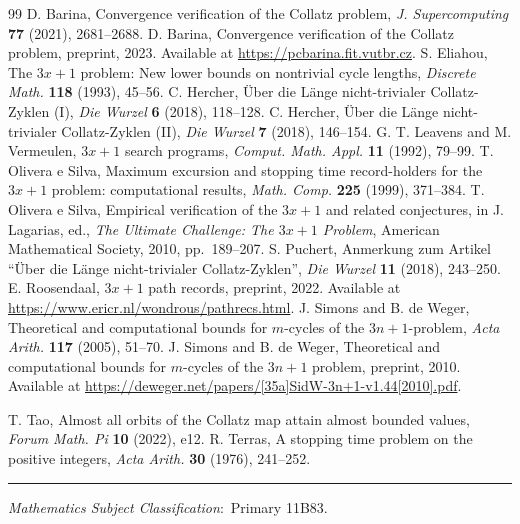 \documentclass[12pt,reqno]{article}
\begin{document}
\begin{thebibliography}{99}
 D. Barina, Convergence verification of the Collatz problem, \textit{J. Supercomputing} \textbf{77} (2021), 2681--2688.
 D. Barina, Convergence verification of the Collatz problem,
preprint, 2023.   Available at \url{https://pcbarina.fit.vutbr.cz}.
  S. Eliahou,  The $3x + 1$ problem:  New lower bounds on nontrivial cycle lengths, \textit{Discrete Math.} \textbf{118} (1993), 45--56.
 C. Hercher, \"{U}ber die L\"{a}nge nicht-trivialer Collatz-Zyklen (I), \textit{Die Wurzel} \textbf{6} (2018), 118--128.
 C. Hercher, \"{U}ber die L\"{a}nge nicht-trivialer Collatz-Zyklen (II), \textit{Die Wurzel} \textbf{7} (2018), 146--154.
 G. T. Leavens and M. Vermeulen,  $3x+1$ search programs, \textit{Comput. Math. Appl.} \textbf{11} (1992), 79--99.
 T. Olivera e Silva, Maximum excursion and stopping time record-holders for the $3x+1$ problem: computational results, \textit{Math. Comp.} \textbf{225} (1999), 371--384.
 T. Olivera e Silva, Empirical verification of the $3x+1$ and related conjectures, in J. Lagarias, ed., \textit{The Ultimate Challenge: The $3x+1$ Problem}, American Mathematical Society, 2010, pp.\ 189--207.
 S. Puchert, Anmerkung zum Artikel ``\"{U}ber die L\"{a}nge nicht-trivialer Collatz-Zyklen'', \textit{Die Wurzel} \textbf{11} (2018), 243--250.
E. Roosendaal, $3x+1$ path records, preprint,
2022.  Available at \url{https://www.ericr.nl/wondrous/pathrecs.html}.
 J. Simons and B. de Weger, Theoretical and computational bounds for $m$-cycles of the $3n+1$-problem, \textit{Acta Arith.} \textbf{117} (2005), 51--70.
 J. Simons and  B. de Weger, Theoretical and computational
bounds for $m$-cycles of the $3n + 1$ problem, preprint, 2010.  Available at
\url{https://deweger.net/papers/[35a]SidW-3n+1-v1.44[2010].pdf}.

 T. Tao, Almost all orbits of the Collatz map attain almost bounded values, \textit{Forum Math. Pi} \textbf{10} (2022), e12.
 R. Terras, A stopping time problem on the positive integers, \textit{Acta Arith.} \textbf{30} (1976), 241--252.
\end{thebibliography}


\bigskip
\hrule
\bigskip

 \emph{Mathematics Subject Classification}:~Primary 11B83.

\medskip
\end{document}
